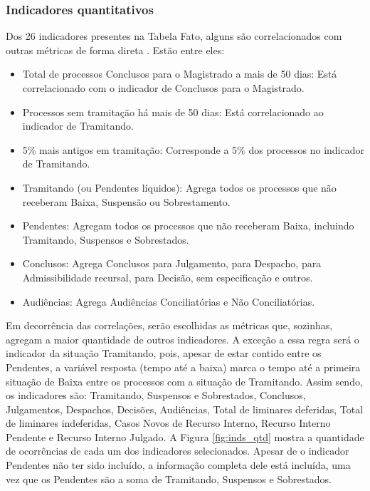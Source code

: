 \subsubsection{Indicadores quantitativos}
Dos 26 indicadores presentes na Tabela Fato, alguns são correlacionados com outras métricas de forma direta \cite{painelestatistica}. Estão entre eles:
\begin{itemize}
    \item Total de processos Conclusos para o Magistrado a mais de 50 dias: Está correlacionado com o indicador de Conclusos para o Magistrado.
    \item Processos sem tramitação há mais de 50 dias: Está correlacionado ao indicador de Tramitando.
    \item 5\% mais antigos em tramitação: Corresponde a 5\% dos processos no indicador de Tramitando.
    \item Tramitando (ou Pendentes líquidos): Agrega todos os processos que não receberam Baixa, Suspensão ou Sobrestamento.
    \item Pendentes: Agregam todos os processos que não receberam Baixa, incluindo Tramitando, Suspensos e Sobrestados.
    \item Conclusos: Agrega Conclusos para Julgamento, para Despacho, para Admissibilidade recursal, para Decisão, sem especificação e outros.
    \item Audiências: Agrega Audiências Conciliatórias e Não Conciliatórias.
\end{itemize}

Em decorrência das correlações, serão escolhidas as métricas que, sozinhas, agregam a maior quantidade de outros indicadores. A exceção a essa regra será o indicador da situação Tramitando, pois, apesar de estar contido entre os Pendentes, a variável resposta (tempo até a baixa) marca o tempo até a primeira situação de Baixa entre os processos com a situação de Tramitando. Assim sendo, os indicadores são: Tramitando, Suspensos e Sobrestados, Conclusos, Julgamentos, Despachos, Decisões, Audiências, Total de liminares deferidas, Total de liminares indeferidas, Casos Novos de Recurso Interno, Recurso Interno Pendente e Recurso Interno Julgado. A Figura \ref{fig:inds_qtd} mostra a quantidade de ocorrências de cada um dos indicadores selecionados. Apesar de o indicador Pendentes não ter sido incluído, a informação completa dele está incluída, uma vez que os Pendentes são a soma de Tramitando, Suspensos e Sobrestados.

